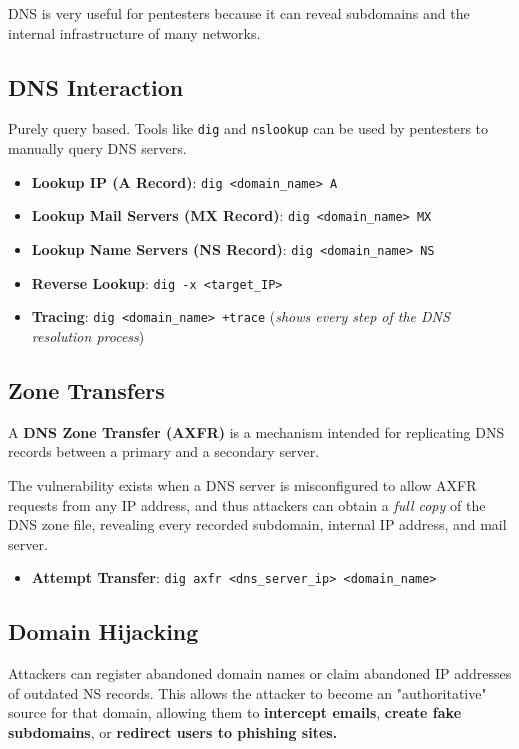 \documentclass[12pt, letterpaper]{article}
\begin{document}
DNS is very useful for pentesters because it can reveal subdomains and the internal infrastructure of many networks.

\subsection*{DNS Interaction}

Purely query based. Tools like \texttt{dig} and \texttt{nslookup} can be used by pentesters to manually query DNS servers.

\begin{itemize}
    \item \textbf{Lookup IP (A Record)}: \texttt{dig <domain\_name> A}
    \item \textbf{Lookup Mail Servers (MX Record)}: \texttt{dig <domain\_name> MX}
    \item \textbf{Lookup Name Servers (NS Record)}: \texttt{dig <domain\_name> NS}
    \item \textbf{Reverse Lookup}: \texttt{dig -x <target\_IP>}
    \item \textbf{Tracing}: \texttt{dig <domain\_name> +trace} (\textit{shows every step of the DNS resolution process})
\end{itemize}

\subsection*{Zone Transfers}

A \textbf{DNS Zone Transfer (AXFR)} is a mechanism intended for replicating DNS records between a primary and a secondary server.
\medskip

The vulnerability exists when a DNS server is misconfigured to allow AXFR requests from any IP address, and thus attackers can obtain a \textit{full copy} of the DNS zone file, revealing every recorded subdomain, internal IP address, and mail server.

\begin{itemize}
    \item \textbf{Attempt Transfer}: \texttt{dig axfr \@<dns\_server\_ip> <domain\_name>}
\end{itemize}

\subsection*{Domain Hijacking}

Attackers can register abandoned domain names or claim abandoned IP addresses of outdated NS records. This allows the attacker to become an "authoritative" source for that domain, allowing them to \textbf{intercept emails}, \textbf{create fake subdomains}, or \textbf{redirect users to phishing sites.}
\end{document}
